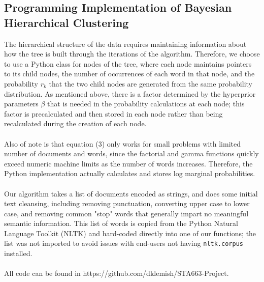 \documentclass{article}
\begin{document}
\subsection{Programming Implementation of Bayesian Hierarchical Clustering}
The hierarchical structure of the data requires maintaining information about how the tree is built through the iterations of the algorithm.  Therefore, we choose to use a Python class for nodes of the tree, where each node maintains pointers to its child nodes, the number of occurrences of each word in that node, and the probability $r_k$ that the two child nodes are generated from the same probability distribution.  As mentioned above, there is a factor determined by the hyperprior parameters $\beta$ that is needed in the probability calculations at each node; this factor is precalculated and then stored in each node rather than being recalculated during the creation of each node.
\\
\\
Also of note is that equation (3) only works for small problems with limited number of documents and words, since the factorial and gamma functions quickly exceed numeric machine limits as the number of words increases.  Therefore, the Python implementation actually calculates and stores log marginal probabilities.
\\
\\
Our algorithm takes a list of documents encoded as strings, and does some initial text cleansing, including removing punctuation, converting upper case to lower case, and removing common "stop" words that generally impart no meaningful semantic information.  This list of words is copied from the Python Natural Language Toolkit (NLTK) and hard-coded directly into one of our functions; the list was not imported to avoid issues with end-users not having \texttt{nltk.corpus} installed.
\\
\\
All code can be found in https://github.com/dklemish/STA663-Project.
\end{document}
